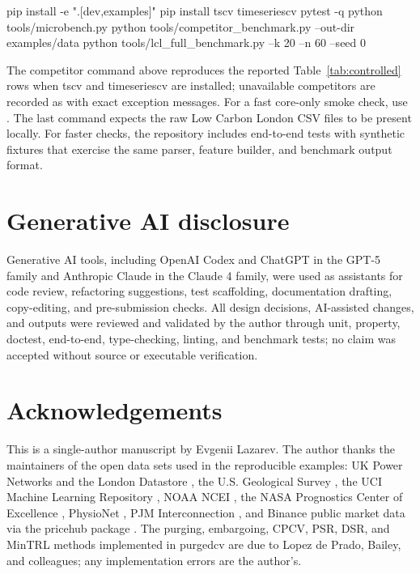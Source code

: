 \documentclass[11pt]{article}
\newcommand{\pcv}{\textsf{purgedcv}}
\newcommand{\pkg}[1]{\textsf{#1}}
\DeclareRobustCommand{\code}[1]{\texttt{\detokenize{#1}}}
\begin{document}
\begin{Code}
pip install -e ".[dev,examples]"
pip install tscv timeseriescv
pytest -q
python tools/microbench.py
python tools/competitor_benchmark.py --out-dir examples/data
python tools/lcl_full_benchmark.py --k 20 --n 60 --seed 0
\end{Code}

The competitor command above reproduces the reported Table~\ref{tab:controlled}
rows when \pkg{tscv} and \pkg{timeseriescv} are installed; unavailable
competitors are recorded as \code{NOT RUN} with exact exception messages. For a
fast core-only smoke check, use \code{--core-only}. The last command expects the
raw Low Carbon London CSV files to be present locally. For faster checks, the
repository includes end-to-end tests with synthetic fixtures that exercise the
same parser, feature builder, and benchmark output format.

\section*{Generative AI disclosure}

Generative AI tools, including OpenAI Codex and ChatGPT in the GPT-5 family and
Anthropic Claude in the Claude 4 family, were used as assistants for code
review, refactoring suggestions, test scaffolding, documentation drafting,
copy-editing, and pre-submission checks. All design decisions, AI-assisted
changes, and outputs were reviewed and validated by the author through unit,
property, doctest, end-to-end, type-checking, linting, and benchmark tests; no
claim was accepted without source or executable verification.

\section*{Acknowledgements}

This is a single-author manuscript by Evgenii Lazarev. The author thanks the
maintainers of the open data sets used in the reproducible examples: UK Power
Networks and the London Datastore \citep{ukpn_lcl}, the U.S. Geological Survey
\citep{usgs_catalog}, the UCI Machine Learning Repository
\citep{devito2008airquality}, NOAA NCEI \citep{noaa_ghcnd}, the NASA Prognostics
Center of Excellence \citep{nasa_cmapss}, PhysioNet
\citep{physionet2012goldberger,physionet2012silva}, PJM Interconnection
\citep{pjm_load}, and Binance public market data via the \pkg{pricehub} package
\citep{binance_pricehub}. The purging, embargoing, CPCV, PSR, DSR, and MinTRL
methods implemented in \pcv{} are due to Lopez de Prado, Bailey, and colleagues;
any implementation errors are the author's.



\end{document}
